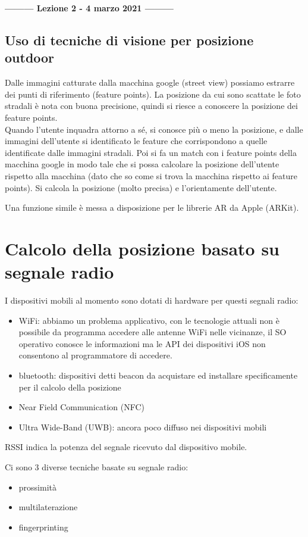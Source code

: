 \begin{center}
    \textbf{--------- Lezione 2 - 4 marzo 2021 ---------}
\end{center}
\subsection{Uso di tecniche di visione per posizione outdoor}
Dalle immagini catturate dalla macchina google (street view) possiamo estrarre dei punti di riferimento (feature points). 
La posizione da cui sono scattate le foto stradali è nota con buona precisione, quindi si riesce a conoscere la posizione dei feature points.
\\ Quando l'utente inquadra attorno a sé, si conosce più o meno la posizione, e dalle immagini dell'utente si identificato le feature che corrispondono a quelle identificate dalle immagini stradali. Poi si fa un match con i feature points della macchina google in modo tale che si possa calcolare la posizione dell'utente rispetto alla macchina (dato che so come si trova la macchina rispetto ai feature points).
Si calcola la posizione (molto precisa) e l'orientamente dell'utente. 

Una funzione simile è messa a disposizione per le librerie AR da Apple (ARKit).    

\section{Calcolo della posizione basato su segnale radio}
I dispositivi mobili al momento sono dotati di hardware per questi segnali radio:
\begin{itemize}
    \item WiFi: abbiamo un problema applicativo, con le tecnologie attuali non è possibile da programma accedere alle antenne WiFi nelle vicinanze, il SO operativo conosce le informazioni ma le API dei dispositivi iOS non consentono al programmatore di accedere. 
    \item bluetooth: dispositivi detti beacon da acquistare ed installare specificamente per il calcolo della posizione
    \item Near Field Communication (NFC)
    \item Ultra Wide-Band (UWB): ancora poco diffuso nei dispositivi mobili
\end{itemize}
RSSI indica la potenza del segnale ricevuto dal dispositivo mobile. 

Ci sono 3 diverse tecniche basate su segnale radio:
\begin{itemize}
    \item prossimità
    \item multilaterazione
    \item fingerprinting
\end{itemize}

